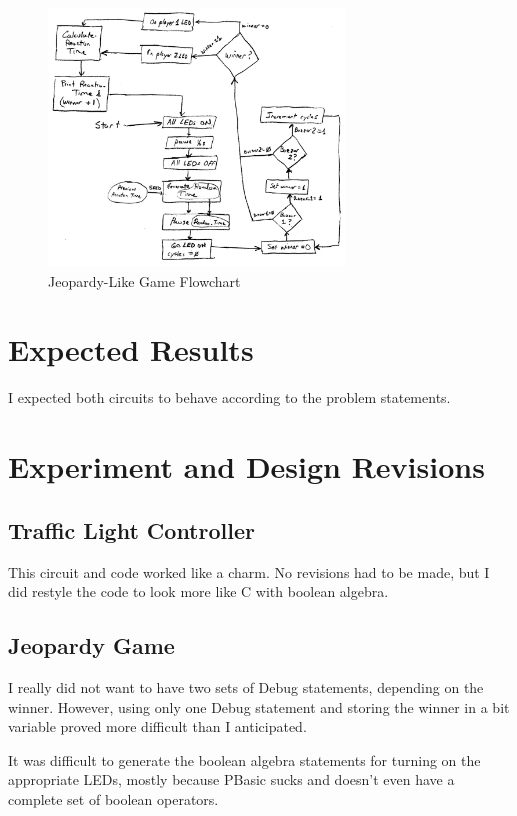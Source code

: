 \documentclass[11pt]{article}
\begin{document}
\begin{figure}[ht]
\centering
\includegraphics[width=0.7\textwidth]{jeopardy-flowchart.pdf}
\caption{Jeopardy-Like Game Flowchart}
\label{jeopardy-flowchart}
\end{figure}

\section{Expected Results}

I expected both circuits to behave according to the problem statements.

\section{Experiment and Design Revisions}

\subsection{Traffic Light Controller}

This circuit and code worked like a charm.
No revisions had to be made, but I did restyle the code to look more like C with boolean algebra.

\subsection{Jeopardy Game}

I really did not want to have two sets of Debug statements, depending on the winner.
However, using only one Debug statement and storing the winner in a bit variable proved more difficult than I anticipated.

It was difficult to generate the boolean algebra statements for turning on the appropriate LEDs,
mostly because PBasic sucks and doesn't even have a complete set of boolean operators.
\end{document}
